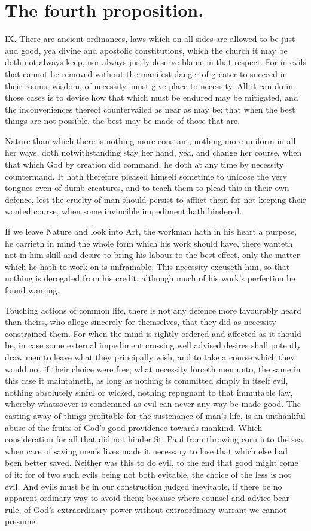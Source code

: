 \section*{The fourth proposition.}
IX. There are ancient ordinances, laws which on all sides are allowed to be just and good, yea divine and apostolic constitutions, which the church it may be doth not always keep, nor always justly deserve blame in that respect. For in evils that cannot be removed without the manifest danger of greater to succeed in their rooms, wisdom, of necessity, must give place to necessity. All it can do in those cases is to devise how that which must be endured may be mitigated, and the inconveniences thereof countervailed as near as may be; that when the best things are not possible, the best may be made of those that are.

Nature than which there is nothing more constant, nothing more uniform in all her ways, doth notwithstanding stay her hand, yea, and change her course, when that which God by creation did command, he doth at any time by necessity countermand. It hath therefore pleased himself sometime to unloose the very tongues even of dumb creatures, and to teach them to plead this in their own defence, lest the cruelty of man should persist to afflict them for not keeping their wonted course, when some invincible impediment hath hindered.

If we leave Nature and look into Art, the workman hath in his heart a purpose, he carrieth in mind the whole form which his work should have, there wanteth not in him skill and desire to bring his labour to the best effect, only the matter which he hath to work on is unframable. This necessity excuseth him, so that nothing is derogated from his credit, although much of his work’s perfection be found wanting.

Touching actions of common life, there is not any defence more favourably heard than theirs, who allege sincerely for  themselves, that they did as necessity constrained them. For when the mind is rightly ordered and affected as it should be, in case some external impediment crossing well advised desires shall potently draw men to leave what they principally wish, and to take a course which they would not if their choice were free; what necessity forceth men unto, the same in this case it maintaineth, as long as nothing is committed simply in itself evil, nothing absolutely sinful or wicked, nothing repugnant to that immutable law, whereby whatsoever is condemned as evil can never any way be made good. The casting away of things profitable for the sustenance of man’s life, is an unthankful abuse of the fruits of God’s good providence towards mankind. Which consideration for all that did not hinder St. Paul from throwing corn into the sea, when care of saving men’s lives made it necessary to lose that which else had been better saved. Neither was this to do evil, to the end that good might come of it: for of two such evils being not both evitable, the choice of the less is not evil. And evils must be in our construction judged inevitable, if there be no apparent ordinary way to avoid them; because where counsel and advice bear rule, of God’s extraordinary power without extraordinary warrant we cannot presume.

